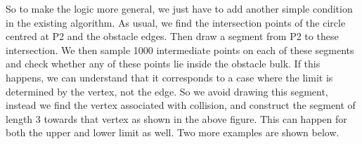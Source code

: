 \documentclass[12pt]{article}
\begin{document}
\begin{itemize}
\begin{figure}[h!]
\end{figure}
\newline
So to make the logic more general, we just have to add another simple condition in the existing algorithm. As usual, we find the intersection points of the circle centred at P2 and the obstacle edges. Then draw a segment from P2 to these intersection. We then sample 1000 intermediate points on each of these segments and check whether any of these points lie inside the obstacle bulk. If this happens, we can understand that it corresponds to a case where the limit is determined by the vertex, not the edge.
So we avoid drawing this segment, instead we find the vertex associated with collision, and construct the segment of length 3 towards that vertex as shown in the above figure. This can happen for both the upper and lower limit as well. Two more examples are shown below.
\begin{figure}[h!]
    \centering
\end{figure}
\end{itemize}
\end{document}
